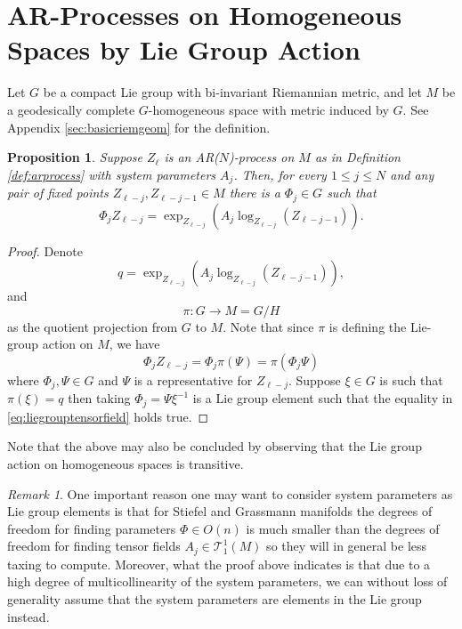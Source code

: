 \documentclass[12pt,a4paper]{article}
\newtheorem{prop}[theorem]{Proposition}
\theoremstyle{definition}
\theoremstyle{remark}
\newtheorem*{remark}{Remark}
\begin{document}
\section{AR-Processes on Homogeneous Spaces by Lie Group Action}
\label{sec:ARhomo}

Let $G$ be a compact Lie group with bi-invariant Riemannian metric, and let $M$ be a geodesically complete $G$-homogeneous space with metric induced by $G$. See Appendix \ref{sec:basicriemgeom} for the definition.

\begin{prop}
\label{prop:Argroup}
Suppose $Z_\ell$ is an AR($N$)-process on $M$ as in Definition \ref{def:arprocess} with system parameters $A_j$.
Then, for every $1\leq j\leq N$ and any pair of fixed points $Z_{\ell-j},Z_{\ell-j-1}\in M$ there is a $\Phi_j\in G$ such that
\begin{equation}
\Phi_j Z_{\ell-j} = \exp_{Z_{\ell-j}}(A_j \log_{Z_{\ell-j}}(Z_{\ell-j-1})).
\label{eq:liegrouptensorfield}
\end{equation}
\end{prop}

\begin{proof}
Denote
\[
q = \exp_{Z_{\ell-j}}(A_j \log_{Z_{\ell-j}}(Z_{\ell-j-1})),
\]
and
\[
\pi: G\rightarrow M=G/H
\]
as the quotient projection from $G$ to $M$. Note that since $\pi$ is defining the Lie-group action on $M$, we have 
\[
\Phi_j Z_{\ell-j} = \Phi_j \pi(\Psi)=\pi(\Phi_j \Psi)
\]
where $\Phi_j,\Psi\in G$ and $\Psi$ is a representative for $Z_{\ell-j}$. Suppose $\xi\in G$ is such that $\pi(\xi)=q$ then taking $\Phi_j = \Psi \xi^{-1}$ is a Lie group element such that the equality in \eqref{eq:liegrouptensorfield} holds true.
\end{proof}

Note that the above may also be concluded by observing that the Lie group action on homogeneous spaces is transitive.

\begin{remark}
One important reason one may want to consider system parameters as Lie group elements is that for Stiefel and Grassmann manifolds the degrees of freedom for finding parameters $\Phi \in O(n)$ is much smaller than the degrees of freedom for finding tensor fields $A_j\in \mathcal{T}^1_1(M)$ so they will in general be less taxing to compute. Moreover, what the proof above indicates is that due to a high degree of multicollinearity of the system parameters, we can without loss of generality assume that the system parameters are elements in the Lie group instead.
\end{remark}
\end{document}
